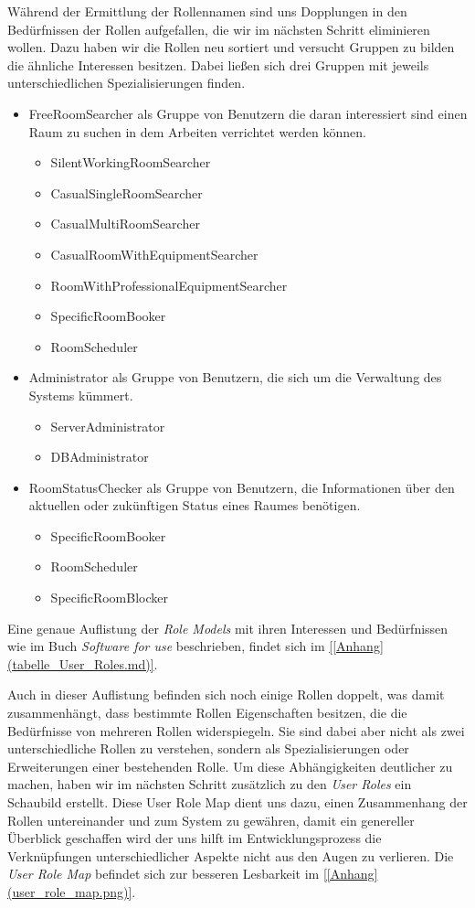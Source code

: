 Während der Ermittlung der Rollennamen sind uns Dopplungen in den Bedürfnissen
der Rollen aufgefallen, die wir im nächsten Schritt eliminieren wollen.
Dazu haben wir die Rollen neu sortiert und versucht Gruppen zu bilden die
ähnliche Interessen besitzen.
Dabei ließen sich drei Gruppen mit jeweils unterschiedlichen Spezialisierungen finden.

\begin{itemize}
	\item FreeRoomSearcher als Gruppe von Benutzern die daran interessiert sind einen Raum zu suchen in dem Arbeiten verrichtet werden können.
	\begin{itemize}
		\item SilentWorkingRoomSearcher
    	\item CasualSingleRoomSearcher
   		\item CasualMultiRoomSearcher
    	\item CasualRoomWithEquipmentSearcher
    	\item RoomWithProfessionalEquipmentSearcher
    	\item SpecificRoomBooker
    	\item RoomScheduler
	\end{itemize}
	\item Administrator als Gruppe von Benutzern, die sich um die Verwaltung des Systems kümmert.
	\begin{itemize}
	    \item ServerAdministrator
    	\item DBAdministrator
	\end{itemize}
	\item RoomStatusChecker als Gruppe von Benutzern, die Informationen über den aktuellen oder zukünftigen Status eines Raumes benötigen.
	\begin{itemize}
		\item SpecificRoomBooker
		\item RoomScheduler
		\item SpecificRoomBlocker
	\end{itemize}
\end{itemize}

Eine genaue Auflistung der \textit{Role Models} mit ihren Interessen und Bedürfnissen
wie im Buch \textit{Software for use} beschrieben, findet sich im \ref{[Anhang](tabelle_User_Roles.md)}.

Auch in dieser Auflistung befinden sich noch einige Rollen doppelt, was damit
zusammenhängt, dass bestimmte Rollen Eigenschaften besitzen, die die
Bedürfnisse von mehreren Rollen widerspiegeln. Sie sind dabei aber nicht als
zwei unterschiedliche Rollen zu verstehen, sondern als Spezialisierungen oder
Erweiterungen einer bestehenden Rolle. Um diese Abhängigkeiten deutlicher zu
machen, haben wir im nächsten Schritt zusätzlich zu den \textit{User Roles} ein
Schaubild erstellt. Diese User Role Map \textit{\citep[Kapitel~4]{softwareForUse}} dient uns dazu,
einen Zusammenhang der Rollen untereinander und zum System zu gewähren, damit
ein genereller Überblick geschaffen wird der uns hilft im Entwicklungsprozess
die Verknüpfungen unterschiedlicher Aspekte nicht aus den Augen zu verlieren.
Die \textit{User Role Map} befindet sich zur besseren Lesbarkeit im \ref{[Anhang](user_role_map.png)}.

